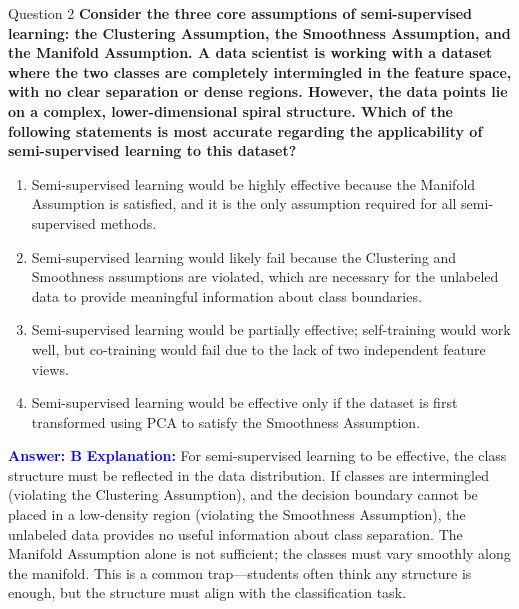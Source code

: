 \documentclass{beamer}
\begin{document}
	\begin{frame}{Question 2}
		\textbf{Consider the three core assumptions of semi-supervised learning: the Clustering Assumption, the Smoothness Assumption, and the Manifold Assumption. A data scientist is working with a dataset where the two classes are completely intermingled in the feature space, with no clear separation or dense regions. However, the data points lie on a complex, lower-dimensional spiral structure. Which of the following statements is most accurate regarding the applicability of semi-supervised learning to this dataset?}
		\begin{enumerate}
			\item Semi-supervised learning would be highly effective because the Manifold Assumption is satisfied, and it is the only assumption required for all semi-supervised methods.
			\item Semi-supervised learning would likely fail because the Clustering and Smoothness assumptions are violated, which are necessary for the unlabeled data to provide meaningful information about class boundaries.
			\item Semi-supervised learning would be partially effective; self-training would work well, but co-training would fail due to the lack of two independent feature views.
			\item Semi-supervised learning would be effective only if the dataset is first transformed using PCA to satisfy the Smoothness Assumption.
		\end{enumerate}
		\vspace{0.2cm}
		\textcolor{blue}{\textbf{Answer: B}}
		\vspace{0.2cm}
		\textcolor{blue}{\textbf{Explanation:}} For semi-supervised learning to be effective, the class structure must be reflected in the data distribution. If classes are intermingled (violating the Clustering Assumption), and the decision boundary cannot be placed in a low-density region (violating the Smoothness Assumption), the unlabeled data provides no useful information about class separation. The Manifold Assumption alone is not sufficient; the classes must vary smoothly along the manifold. This is a common trap—students often think any structure is enough, but the structure must align with the classification task.
	\end{frame}
	
\end{document}
